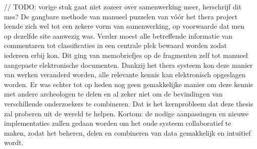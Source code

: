 // TODO: vorige stuk gaat niet zozeer over samenwerking meer, herschrijf dit
mss? De gangbare methode van manueel puzzelen van v\'o\'or het thera project leende
zich wel tot een zekere vorm van samenwerking, op voorwaarde dat men op dezelfde
site aanwezig was. Verder moest alle betreffende informatie van commentaren tot
classificaties in een centrale plek bewaard worden zodat iedereen erbij kon. Dit ging van memobriefjes op de fragmenten zelf tot manueel
aangepaste elektronische documenten. Dankzij het thera systeem kon
deze manier van werken veranderd worden, alle relevante kennis kan elektronisch
opgeslagen worden. Er was echter tot op heden nog geen gemakkelijke
manier om deze kennis met andere archeologen te delen en al zeker niet om de bevindingen van verschillende onderzoekers te combineren. 
Dat is het kernprobleem dat deze thesis zal proberen uit de wereld te helpen.
Kortom: de nodige aanpassingen en nieuwe implementaties zullen gedaan worden om het oude systeem collaboratief te maken, zodat het beheren, delen en combineren van data gemakkelijk en intuitief wordt.\\
